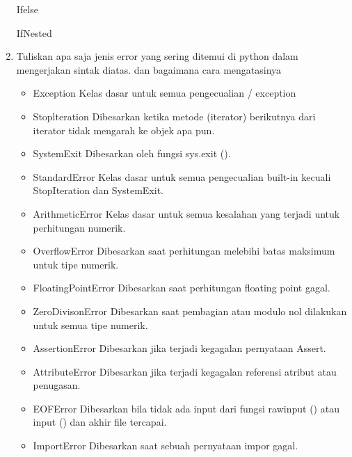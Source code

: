 \begin{enumerate}
    Ifelse
    
    
    IfNested
    

    \item Tuliskan apa saja jenis error yang sering ditemui di python dalam mengerjakan
    sintak diatas. dan bagaimana cara mengatasinya
    \begin{itemize}
        \item Exception
        Kelas dasar untuk semua pengecualian / exception

        \item Stoplteration
        Dibesarkan ketika metode (iterator) berikutnya dari iterator tidak mengarah ke objek apa pun.

        \item SystemExit
        Dibesarkan oleh fungsi sys.exit ().

        \item StandardError
        Kelas dasar untuk semua pengecualian built-in kecuali StopIteration dan SystemExit.

        \item ArithmeticError
        Kelas dasar untuk semua kesalahan yang terjadi untuk perhitungan numerik.

        \item OverflowError
        Dibesarkan saat perhitungan melebihi batas maksimum untuk tipe numerik.

        \item FloatingPointError
        Dibesarkan saat perhitungan floating point gagal.

        \item ZeroDivisonError
        Dibesarkan saat pembagian atau modulo nol dilakukan untuk semua tipe numerik.

        \item AssertionError
        Dibesarkan jika terjadi kegagalan pernyataan Assert.

        \item AttributeError
        Dibesarkan jika terjadi kegagalan referensi atribut atau penugasan.
         
        \item EOFError
        Dibesarkan bila tidak ada input dari fungsi rawinput () atau input () dan akhir file tercapai.

        \item ImportError
        Dibesarkan saat sebuah pernyataan impor gagal.


\end{itemize}
\end{enumerate}
